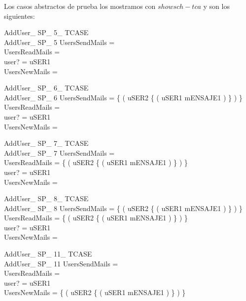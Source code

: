 Los casos abstractos de prueba los mostramos con $showsch -tca$ y son los siguientes:

\begin{schema}{AddUser\_ SP\_ 5\_ TCASE}\\
 AddUser\_ SP\_ 5
\where
 UsersSendMails =~\emptyset \\
 UsersReadMails =~\emptyset \\
 user? = uSER1 \\
 UsersNewMails =~\emptyset
\end{schema}


\begin{schema}{AddUser\_ SP\_ 6\_ TCASE}\\
 AddUser\_ SP\_ 6
\where
 UsersSendMails = \{ ( uSER2 \mapsto \{ ( uSER1 \mapsto mENSAJE1 ) \} ) \} \\
 UsersReadMails =~\emptyset \\
 user? = uSER1 \\
 UsersNewMails =~\emptyset
\end{schema}


\begin{schema}{AddUser\_ SP\_ 7\_ TCASE}\\
 AddUser\_ SP\_ 7
\where
 UsersSendMails =~\emptyset \\
 UsersReadMails = \{ ( uSER2 \mapsto \{ ( uSER1 \mapsto mENSAJE1 ) \} ) \} \\
 user? = uSER1 \\
 UsersNewMails =~\emptyset
\end{schema}


\begin{schema}{AddUser\_ SP\_ 8\_ TCASE}\\
 AddUser\_ SP\_ 8
\where
 UsersSendMails = \{ ( uSER2 \mapsto \{ ( uSER1 \mapsto mENSAJE1 ) \} ) \} \\
 UsersReadMails = \{ ( uSER2 \mapsto \{ ( uSER1 \mapsto mENSAJE1 ) \} ) \} \\
 user? = uSER1 \\
 UsersNewMails =~\emptyset
\end{schema}


\begin{schema}{AddUser\_ SP\_ 11\_ TCASE}\\
 AddUser\_ SP\_ 11
\where
 UsersSendMails =~\emptyset \\
 UsersReadMails =~\emptyset \\
 user? = uSER1 \\
 UsersNewMails = \{ ( uSER2 \mapsto \{ ( uSER1 \mapsto mENSAJE1 ) \} ) \}
\end{schema}


